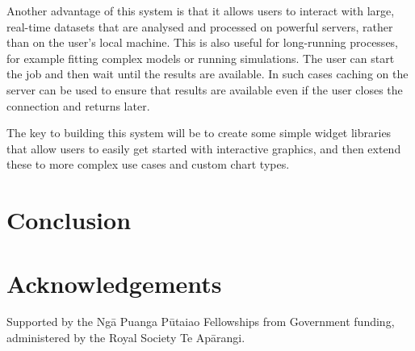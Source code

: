 \documentclass{article}
\begin{document}
Another advantage of this system is that it allows users to interact with large, real-time datasets that are analysed and processed on powerful servers, rather than on the user's local machine.
This is also useful for long-running processes, for example fitting complex models or running simulations.
The user can start the job and then wait until the results are available.
In such cases caching on the server can be used to ensure that results are available even if the user closes the connection and returns later.

The key to building this system will be to create some simple widget libraries that allow users to easily get started with interactive graphics, and then extend these to more complex use cases and custom chart types.


\section{Conclusion}
\label{sec:conclusion}




\section*{Acknowledgements}

Supported by the Ngā Puanga Pūtaiao Fellowships from Government funding, administered by the Royal Society Te Apārangi.

\printglossary[type=\acronymtype,nonumberlist,nopostdot]

\printbibliography
\end{document}
